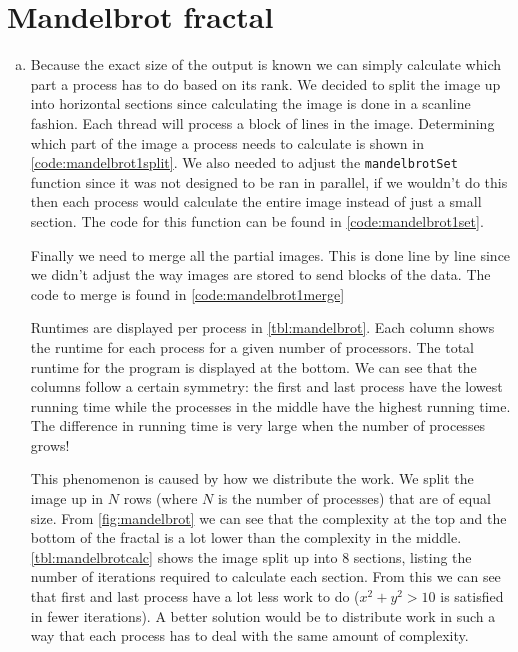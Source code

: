 \documentclass[a4paper]{article}
\begin{document}
\section{Mandelbrot fractal}
\begin{enumerate}[(a)]
	\item Because the exact size of the output is known we can simply calculate which part a process has to do based on its rank. We decided to split the image up into horizontal sections since calculating the image is done in a scanline fashion. Each thread will process a block of lines in the image. Determining which part of the image a process needs to calculate is shown in \autoref{code:mandelbrot1split}. We also needed to adjust the \texttt{mandelbrotSet} function since it was not designed to be ran in parallel, if we wouldn't do this then each process would calculate the entire image instead of just a small section. The code for this function can be found in \autoref{code:mandelbrot1set}.
	
	
	
	Finally we need to merge all the partial images. This is done line by line since we didn't adjust the way images are stored to send blocks of the data. The code to merge is found in \autoref{code:mandelbrot1merge}
	
		
	Runtimes are displayed per process in \autoref{tbl:mandelbrot}. Each column shows the runtime for each process for a given number of processors. The total runtime for the program is displayed at the bottom. We can see that the columns follow a certain symmetry: the first and last process have the lowest running time while the processes in the middle have the highest running time. The difference in running time is very large when the number of processes grows!
	
	This phenomenon is caused by how we distribute the work. We split the image up in $N$ rows (where $N$ is the number of processes) that are of equal size. From \autoref{fig:mandelbrot} we can see that the complexity at the top and the bottom of the fractal is a lot lower than the complexity in the middle. \autoref{tbl:mandelbrotcalc} shows the image split up into 8 sections, listing the number of iterations required to calculate each section. From this we can see that first and last process have a lot less work to do ($x^2 + y^2 > 10$ is satisfied in fewer iterations). A better solution would be to distribute work in such a way that each process has to deal with the same amount of complexity.
	

\end{enumerate}
\end{document}

